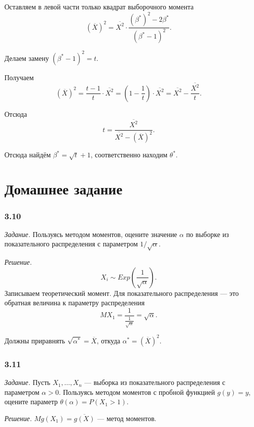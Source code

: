\begin{enumerate}[label=\alph*)]
  Оставляем в левой части только квадрат выборочного момента
  $$ \left( \overline{X} \right)^2 =
    \overline{X^2} \cdot
    \frac{ \left( \beta^* \right)^2 - 2 \beta^*}{ \left( \beta^* - 1 \right)^2}.$$

  Делаем замену $ \left( \beta^* - 1 \right)^2 = t$.

  Получаем
  $$ \left( \overline{X} \right)^2 =
    \frac{t - 1}{t} \cdot \overline{X^2} =
    \left( 1 - \frac{1}{t} \right) \cdot \overline{X^2} =
    \overline{X^2} - \frac{ \overline{X^2}}{t}.$$

  Отсюда
  $$t =
    \frac{ \overline{X^2}}{ \overline{X^2} - \left( \overline{X} \right)^2}.$$

  Отсюда найдём $ \beta^* = \sqrt{t} + 1$, соответственно находим $ \theta^*$.
\end{enumerate}

\section*{Домашнее задание}

\subsubsection*{3.10}

\textit{Задание.}
Пользуясь методом моментов,
оцените значение $ \alpha $
по выборке из показательного распределения с параметром $1 / \sqrt{ \alpha }$.

\textit{Решение.}
$$X_i \sim
  Exp \left( \frac{1}{ \sqrt{ \alpha }} \right).$$
Записываем теоретический момент.
Для показательного распределения --- это обратная величина к параметру распределения
$$MX_1 =
  \frac{1}{ \frac{1}{ \sqrt{ \alpha }}} =
  \sqrt{ \alpha }.$$

Должны приравнять $ \sqrt{ \alpha^*} = \overline{X}$,
откуда $ \alpha^* = \left( \overline{X} \right)^2$.

\subsubsection*{3.11}

\textit{Задание.}
Пусть $X_1, \dotsc, X_n$ --- выборка из показательного распределения с параметром $ \alpha > 0$.
Пользуясь методом моментов с пробной функцией $g \left( y \right) = y$,
оцените параметр $ \theta \left( \alpha \right) = P \left( X_1 > 1 \right) $.

\textit{Решение.} $Mg \left( X_1 \right) = \overline{g \left( X \right) }$ --- метод моментов.

